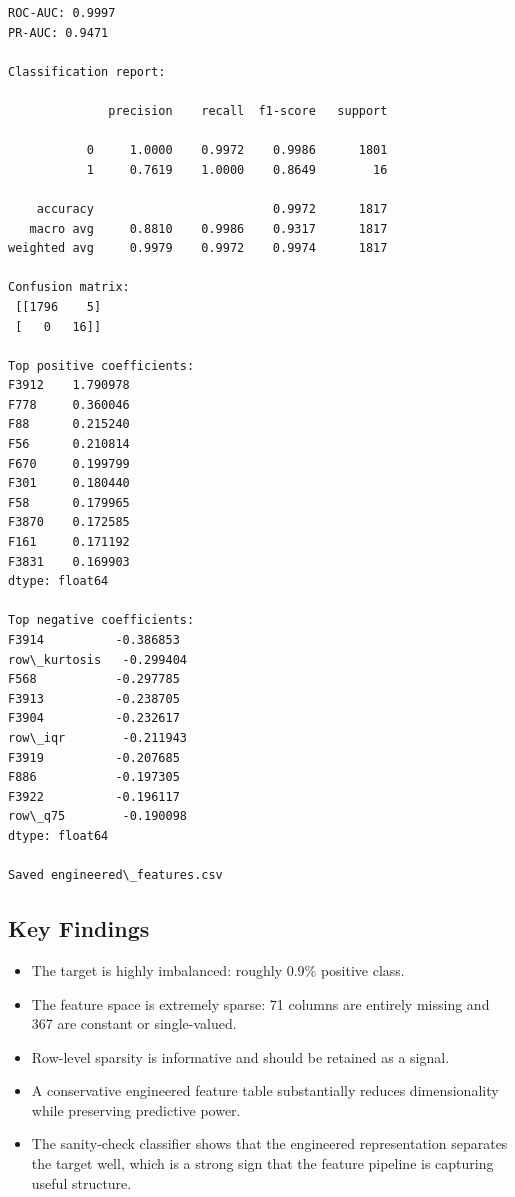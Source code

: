 \documentclass[11pt]{article}
\providecommand{\tightlist}{%
      \setlength{\itemsep}{0pt}\setlength{\parskip}{0pt}}
\begin{document}
    \begin{Verbatim}[commandchars=\\\{\}]
ROC-AUC: 0.9997
PR-AUC: 0.9471

Classification report:

              precision    recall  f1-score   support

           0     1.0000    0.9972    0.9986      1801
           1     0.7619    1.0000    0.8649        16

    accuracy                         0.9972      1817
   macro avg     0.8810    0.9986    0.9317      1817
weighted avg     0.9979    0.9972    0.9974      1817

Confusion matrix:
 [[1796    5]
 [   0   16]]

Top positive coefficients:
F3912    1.790978
F778     0.360046
F88      0.215240
F56      0.210814
F670     0.199799
F301     0.180440
F58      0.179965
F3870    0.172585
F161     0.171192
F3831    0.169903
dtype: float64

Top negative coefficients:
F3914          -0.386853
row\_kurtosis   -0.299404
F568           -0.297785
F3913          -0.238705
F3904          -0.232617
row\_iqr        -0.211943
F3919          -0.207685
F886           -0.197305
F3922          -0.196117
row\_q75        -0.190098
dtype: float64

Saved engineered\_features.csv
    \end{Verbatim}

    \subsection{Key Findings}\label{key-findings}

\begin{itemize}
\tightlist
\item
  The target is highly imbalanced: roughly 0.9\% positive class.
\item
  The feature space is extremely sparse: 71 columns are entirely missing
  and 367 are constant or single-valued.
\item
  Row-level sparsity is informative and should be retained as a signal.
\item
  A conservative engineered feature table substantially reduces
  dimensionality while preserving predictive power.
\item
  The sanity-check classifier shows that the engineered representation
  separates the target well, which is a strong sign that the feature
  pipeline is capturing useful structure.
\end{itemize}


    
    
    
\end{document}
